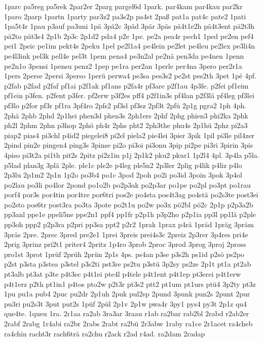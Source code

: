 {1parc
pa5reg
pa5rek
2par2er
2parg
pargel6d
1park.
par4kam
par4kau
par2kr
1paro
2parp
1partn
1party
par3z2
pa3s2p
pa4st
2paß
pat1a
pat4c
pate2
1pati
1pa5t4r
1pau
p3auf
pa3uni
1pä
3pä2c
3päd
3pär
3päs
pä4t1e2h
pä4t3ent
pä2t3h
pä2to
pät3s4
2p1b
2p3c
2p1d2
pda4
p2e
1pe.
pe2a
pea4r
pech1
1ped
pe2en
pef4
pei1
2peic
pe1im
pekt4s
2peku
1pel
pe2l1a4
pe4lein
pe2let
pe4leu
pe2lex
pe3li4n
pe4l3ink
pel3k
pell4e
pel3t
1pem
pena4
pe3n2al
pe2nä
pen3da
pe4nen
1penn
pe2n1o
3pensi
1pensu
penz2
1pep
pe1ra
per2an
1perle
per4na
3pero
per2r1a
1pers
2perse
2persi
3perso
1perü
perwa4
pe3sa
pes3s2
pe2st
pes2th
3pet
1pé
4pf.
p2fab
p2fad
p2faf
pf1ai
p2f1ak
pf1ans
p2fa4r
pf3are
p2f1au
4p3fe.
p2fei
pf1eim
pf1ein
p3fen.
p2fent
p3fer.
pf2erw
p3f2es
pff4
p2f1in3s
pf4lan
p2f3lä
pf4leg
pf3lei
pf3lo
p2for
pf3r
pf1ra
3pf4ro
2pfs2
pf3sl
pf3sz
2pf3t
2pfü
2p1g
pgra2
1ph
4ph.
2phä
2phb
2phd
2p1hei
phen3d
phen3s
2ph1ers
2phf
2phg
phien3
phi2ka
2phk
ph2l
2phm
2phn
p3hop
2phö
ph4r
2phs
pht2
2ph3the
phu4s
2p1hü
2phz
pi2a3
piap2
pias4
pi3chl
p4id2
piegelei8
pi2el
piela2
pie4lei
3pier
3pik
1pil
pi3le
pil4zer
2pind
pin2e
pingen4
ping3s
3pinse
pi2o
pi3oi
pi3onu
3pip
pi2pe
pi3ri
3pirin
3pis
4piso
pi3t2a
pi1th
pit2s
2pitz
pi2z1in
p1j
2p1k2
pku2
pkur1
1p2l4
4pl.
3p4la
p5la.
p5lad
plan3g
3plä
2ple.
ple1c
ple2e
p4leg
ple5n2
2p3ler
2plig
p4lik
p4liz
p4lo
2p3lu
2p1m2
2p1n
1p2o
po3b4
po1c
3pod
2poh
po2i
po3id
3poin
3pok
3p4ol
po2lau
po3li
po4lor
2pond
po1o2b
po2p3ak
po2p3ar
po1pe
po2pl
po3pt
po1rau
porf4
por3s
por4tin
por4tre
por6tri
pos2e
po4sta
pos4t3ag
po4stä
po2s3te
post3ei
po2sto
pos6tr
post3ra
po3ta
3pote
po2t1u
po2w
po3x
pö2bl
pö2c
2p1p
p2p3a2b
pp3anl
ppe1e
ppeli5ne
ppe2n1
ppf4
pp1fr
p2p1h
p3p2ho
p2p1ia
pp3l
pp1lä
p2ple
pp3oh
ppp2
p2p3ra
p2pri
pp3sa
ppt2
p2r2
1prak
1prax
p4rä
1präd
1präg
3präm
3präs
2pre.
2prec
3pred
pre2e1
1prei
3preis
prei4s3c
2preiz
2p3rer
3p4res
pri4e
2prig
3prinz
pri2t1
priter4
2pritz
1p4ro
3prob
2proc
3prod
3prog
3proj
2pross
pro1st
3prot
1prüf
2prüh
2prün
2p1s
4ps.
ps4an
p3se
p3s2h
ps1id
p2sö
ps2po
p2st
p3sta
p3stea
p3stel
p3s2ti
pst3re
ps2tu
p3stü
3p2sy
ps2ze
2p1t
pt1a
pt2ab
pt3alb
pt3at
p3te
p4t3ec
p4t1ei
pte4l
p4tele
p4t1ent
p4t1ep
pt3erei
p4t1erw
p4t1erz
p2th
pt1in1
p4tos
pto2w
p2t3r
pt3s2
ptt2
pt1um
pt1urs
ptü4
3p2ty
pt3z
1pu
pu1a
pub4
2puc
pu2dr
2p1uh
2puk
pul2sp
2pund
3punk
pun2s
2punt
2pur
pu3ri
pu2s3t
3put
put2s
1püf
2pül
2p1v
2p1w
pwa4r
3py1
pys4
py3t
2p1z
qu4
que4te.
1queu
1ra.
2r1aa
ra2ab
3ra3ar
3raau
r1ab
ra2bar
rab2bl
2rabd
r2ab2er
2rabf
2rabg
1r4abi
ra2br
2rabs
2rabt
ra2bü
2r3abw
1raby
ra1ce
2r1acet
ra4cheb
ra4chin
racht3r
rach6trä
ra2chu
r2ack
r2ad
r4ad.
ra2dam
2radap
}
